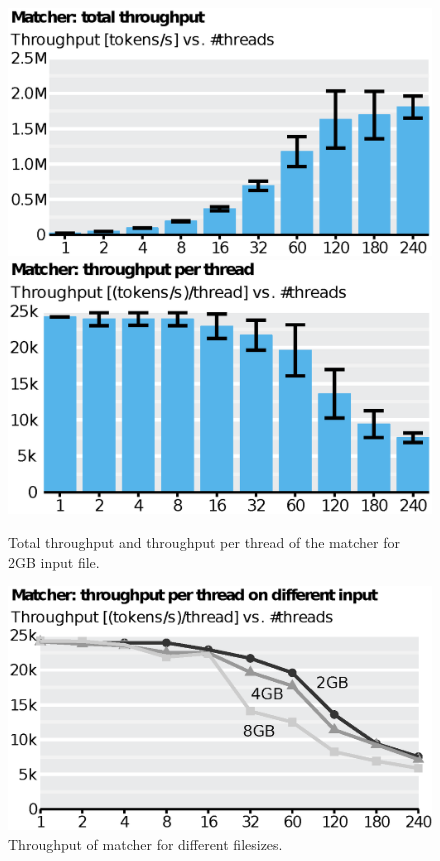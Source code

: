 \begin{figure}
      \includegraphics[scale=.45]{img/def/matcher_tp_total.eps}
      \includegraphics[scale=.45]{img/def/matcher_tp_per_thread.eps}
    \caption{Total throughput and throughput per thread of the matcher 
    for 2GB input file.}
      \label{fig:matchertp}%
\end{figure}

\begin{figure}
    \includegraphics[scale=.45]{img/def/matcher_tp_compare.eps}
    \caption{Throughput of matcher for different filesizes.}
    \label{fig:tkmatchercomp}
\end{figure}

